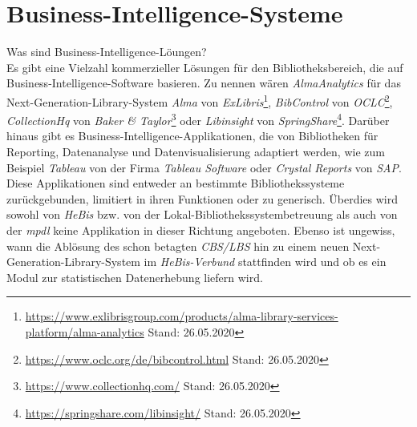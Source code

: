 


\clearpage
\section{Business-Intelligence-Systeme}

Was sind Business-Intelligence-Löungen?\\
Es gibt eine Vielzahl kommerzieller Lösungen für den Bibliotheksbereich, die auf Business-Intelligence-Software basieren.
Zu nennen wären \textit{AlmaAnalytics} für das Next-Generation-Library-System \textit{Alma} von \textit{ExLibris}\footnote{\url{https://www.exlibrisgroup.com/products/alma-library-services-platform/alma-analytics}
Stand: 26.05.2020}, \textit{BibControl} von \textit{OCLC}\footnote{\url{https://www.oclc.org/de/bibcontrol.html} Stand: 26.05.2020},
\textit{CollectionHq} von \textit{Baker \& Taylor}\footnote{\url{https://www.collectionhq.com/} Stand: 26.05.2020} oder \textit{Libinsight} von \textit{SpringShare}\footnote{\url{https://springshare.com/libinsight/} Stand: 26.05.2020}.
Darüber hinaus gibt es Business-Intelligence-Applikationen, die von
Bibliotheken für Reporting, Datenanalyse und Datenvisualisierung adaptiert werden,
wie zum Beispiel \textit{Tableau} von der Firma \textit{Tableau Software} oder
\textit{Crystal Reports} von \textit{SAP}.
Diese Applikationen sind entweder
an bestimmte Bibliothekssysteme zurückgebunden, limitiert in ihren
Funktionen\cite{golas_statistische_2018} oder zu generisch.
Überdies wird sowohl von \textit{HeBis} bzw. von der
Lokal-Bibliothekssystembetreuung als auch von der \textit{mpdl} keine Applikation
in dieser Richtung angeboten.
Ebenso ist ungewiss, wann die Ablösung des schon betagten \textit{CBS/LBS} hin zu
einem neuen Next-Generation-Library-System im \textit{HeBis-Verbund} stattfinden wird und ob
es ein Modul zur statistischen Datenerhebung liefern wird.
